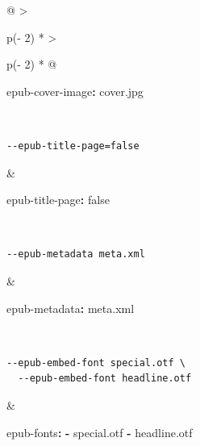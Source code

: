 \documentclass[
  b5paper
]{book}
\newenvironment{Shaded}{}{}
\newcommand{\AttributeTok}[1]{\textcolor[rgb]{0.49,0.56,0.16}{#1}}
\newcommand{\CharTok}[1]{\textcolor[rgb]{0.25,0.44,0.63}{#1}}
\newcommand{\FunctionTok}[1]{\textcolor[rgb]{0.02,0.16,0.49}{#1}}
\newcommand{\KeywordTok}[1]{\textcolor[rgb]{0.00,0.44,0.13}{\textbf{#1}}}
\begin{document}
\begin{longtable}[]{@{}
  >{\raggedright\arraybackslash}p{(\columnwidth - 2\tabcolsep) * }
  >{\raggedright\arraybackslash}p{(\columnwidth - 2\tabcolsep) * }@{}}
\begin{minipage}[t]{\linewidth}
\begin{Shaded}
\begin{Highlighting}[]
\FunctionTok{epub{-}cover{-}image}\KeywordTok{:}\AttributeTok{ cover.jpg}
\end{Highlighting}
\end{Shaded}
\end{minipage} \\
\begin{minipage}[t]{\linewidth}\raggedright
\begin{verbatim}
--epub-title-page=false
\end{verbatim}
\end{minipage} & \begin{minipage}[t]{\linewidth}\raggedright
\begin{Shaded}
\begin{Highlighting}[]
\FunctionTok{epub{-}title{-}page}\KeywordTok{:}\AttributeTok{ }\CharTok{false}
\end{Highlighting}
\end{Shaded}
\end{minipage} \\
\begin{minipage}[t]{\linewidth}\raggedright
\begin{verbatim}
--epub-metadata meta.xml
\end{verbatim}
\end{minipage} & \begin{minipage}[t]{\linewidth}\raggedright
\begin{Shaded}
\begin{Highlighting}[]
\FunctionTok{epub{-}metadata}\KeywordTok{:}\AttributeTok{ meta.xml}
\end{Highlighting}
\end{Shaded}
\end{minipage} \\
\begin{minipage}[t]{\linewidth}\raggedright
\begin{verbatim}
--epub-embed-font special.otf \
  --epub-embed-font headline.otf
\end{verbatim}
\end{minipage} & \begin{minipage}[t]{\linewidth}\raggedright
\begin{Shaded}
\begin{Highlighting}[]
\FunctionTok{epub{-}fonts}\KeywordTok{:}
\AttributeTok{  }\KeywordTok{{-}}\AttributeTok{ special.otf}
\AttributeTok{  }\KeywordTok{{-}}\AttributeTok{ headline.otf}

\end{Highlighting}
\end{Shaded}
\end{minipage}
\end{longtable}
\end{document}
